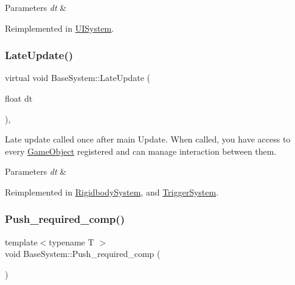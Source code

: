 \begin{DoxyParams}{Parameters}
{\em dt} & \\
\hline
\end{DoxyParams}


Reimplemented in \hyperlink{classUISystem_ac7e49ca17db397a2321a8b89dbc5bd47}{U\+I\+System}.

\mbox{\label{classBaseSystem_ab6520975a6376e59005d3a40456358d4}} 
\subsubsection{\texorpdfstring{Late\+Update()}{LateUpdate()}}
{\footnotesize\ttfamily virtual void Base\+System\+::\+Late\+Update (\begin{DoxyParamCaption}\item[{float}]{dt }\end{DoxyParamCaption})\hspace{0.3cm}{\ttfamily [inline]}, {\ttfamily [virtual]}}



Late update called once after main Update. When called, you have access to every \hyperlink{classGameObject}{Game\+Object} registered and can manage interaction between them. 


\begin{DoxyParams}{Parameters}
{\em dt} & \\
\hline
\end{DoxyParams}


Reimplemented in \hyperlink{classRigidbodySystem_a3ae11c7e5a8572247fb2e01729e32af9}{Rigidbody\+System}, and \hyperlink{classTriggerSystem_a804c490350677fea99a385b1f22a85b6}{Trigger\+System}.

\mbox{\label{classBaseSystem_a672d8b7902414c5a4b46d10f5f403785}} 
\subsubsection{\texorpdfstring{Push\+\_\+required\+\_\+comp()}{Push\_required\_comp()}}
{\footnotesize\ttfamily template$<$typename T $>$ \\
void Base\+System\+::\+Push\+\_\+required\+\_\+comp (\begin{DoxyParamCaption}{ }\end{DoxyParamCaption})\hspace{0.3cm}{\ttfamily [protected]}}



